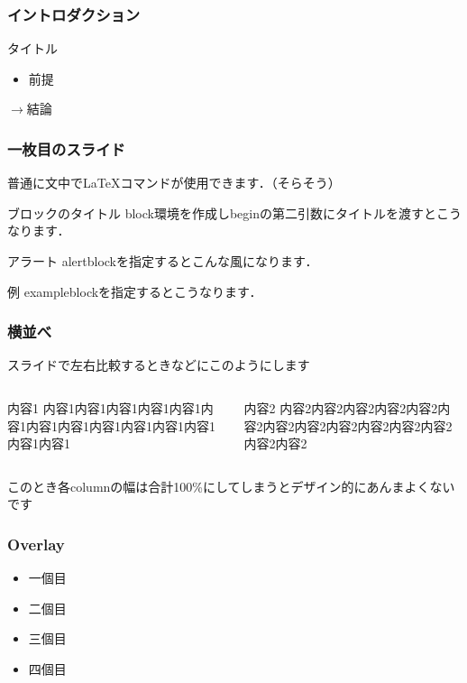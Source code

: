 \documentclass{beamer} %
\theoremstyle{example}
\begin{document}
\begin{frame}
  \frametitle{イントロダクション}
  \begin{block}{タイトル}
    \begin{itemize}
      \item 前提
    \end{itemize}
    \begin{center}
      \(\longrightarrow\)結論
    \end{center}
  \end{block}
\end{frame}

\begin{frame}
  \frametitle{一枚目のスライド}
  普通に文中で\LaTeX コマンドが使用できます．（そらそう）
  \begin{block}{ブロックのタイトル}
    block環境を作成しbeginの第二引数にタイトルを渡すとこうなります．
  \end{block}
  \begin{alertblock}{アラート}
    alertblockを指定するとこんな風になります．
  \end{alertblock}
  \begin{exampleblock}{例}
    exampleblockを指定するとこうなります．
  \end{exampleblock}
\end{frame}

\begin{frame}
  \frametitle{横並べ}
  スライドで左右比較するときなどにこのようにします
  \begin{columns}
    \begin{column}{.4\linewidth} %
      \begin{block}{内容1}
        内容1内容1内容1内容1内容1内容1内容1内容1内容1内容1内容1内容1内容1内容1
      \end{block}
    \end{column}
    \begin{column}{.4\linewidth}
      \begin{block}{内容2}
        内容2内容2内容2内容2内容2内容2内容2内容2内容2内容2内容2内容2内容2内容2
      \end{block}
    \end{column}
  \end{columns}
  このとき各columnの幅は合計100\%にしてしまうとデザイン的にあんまよくないです
\end{frame}

\begin{frame}
  \frametitle{Overlay}
  \begin{itemize}
    \item 一個目
          \pause %
    \item 二個目
          \pause
    \item 三個目
          \pause
    \item 四個目
  \end{itemize}
\end{frame}
\end{document}

